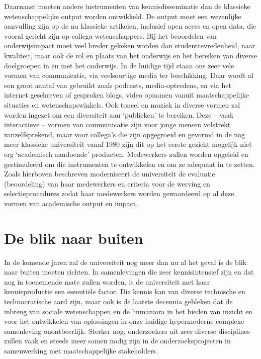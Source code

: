 \documentclass{jote-book}
\begin{document}
	Daarnaast moeten andere instrumenten van kennisdisseminatie dan de klassieke wetenschappelijke output worden ontwikkeld. De output moet een wezenlijke aanvulling zijn op de nu klassieke artikelen, inclusief open acces en open data, die vooral gericht zijn op collega-wetenschappers. Bij het beoordelen van onderwijsimpact moet veel breder gekeken worden dan studenttevredenheid, naar kwaliteit, maar ook de rol en plaats van het onderwijs en het bereiken van diverse doelgroepen in en met het onderwijs. In de huidige tijd staan ons zeer vele vormen van communicatie, via veelsoortige media ter beschikking. Daar wordt al een groot aantal van gebruikt zoals podcasts, media-optredens, en via het internet geschreven of gesproken blogs, video opnamen vanuit maatschappelijke situaties en wetenschapswinkels. Ook toneel en muziek in diverse vormen zal worden ingezet om een diversiteit aan ‘publieken' te bereiken. Deze -- vaak interactieve -- vormen van communicatie zijn voor jonge mensen volstrekt vanzelfsprekend, maar voor collega's die zijn opgegroeid en gevormd in de nog meer klassieke universiteit vanaf 1980 zijn dit op het eerste gezicht mogelijk niet erg ‘academisch aandoende' producten. Medewerkers zullen worden opgeleid en gestimuleerd om die instrumenten te ontwikkelen en om ze adequaat in te zetten. Zoals hierboven beschreven moderniseert de universiteit de evaluatie (beoordeling) van haar medewerkers en criteria voor de werving en selectieprocedures zodat haar medewerkers worden gewaardeerd op al deze vormen van academische output en impact.



	\section{De blik naar buiten}



	In de komende jaren zal de universiteit nog meer dan nu al het geval is de blik naar buiten moeten richten. In samenlevingen die zeer kennisintensief zijn en dat nog in toenemende mate zullen worden, is de universiteit met haar kennisproductie een essentiële factor. Die kennis kan van diverse technische en technocratische aard zijn, maar ook is de laatste decennia gebleken dat de inbreng van sociale wetenschappen en de humaniora in het bieden van inzicht en voor het ontwikkelen van oplossingen in onze huidige hypermoderne complexe samenleving onontbeerlijk. Sterker nog, onderzoekers uit zeer diverse disciplines zullen vaak en steeds meer samen nodig zijn in de onderzoeksprojecten in samenwerking met maatschappelijke stakeholders.
\end{document}
